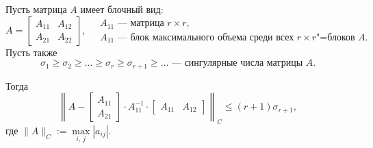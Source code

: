 \begin{theorem}
    Пусть матрица $A$ имеет блочный вид:
    \[
        A = \left[
            \begin{array}{c|c}
                A_{11} & A_{12} \\
                \hline
                A_{21} & A_{22}
            \end{array}
            \right],\quad \begin{array}{l}
            A_{11}\text{~--- матрица } r\times r, \\
            A_{11}\text{~--- блок максимального объема среди всех } r\times r\text{"=блоков } A.
        \end{array}
    \]
    Пусть также
    \[
        \sigma_1\geqslant \sigma_2\geqslant\ldots\geqslant\sigma_r\geqslant\sigma_{r+1}\geqslant\ldots\text{~--- сингулярные числа матрицы $A$.}
    \]

    Тогда
    \[
        \left\| A - \left[
            \begin{array}{c}
                A_{11} \\
                A_{21}
            \end{array}
            \right]\cdot A_{11}^{-1}\cdot \left[
            \begin{array}{cc}
                A_{11} & A_{12}
            \end{array}
            \right]\right\|_{C}\leqslant (r+1)\sigma_{r+1},
    \]
    где $\|A\|_C:=\max\limits_{i,\,j} |a_{ij}|$.


\end{theorem}
